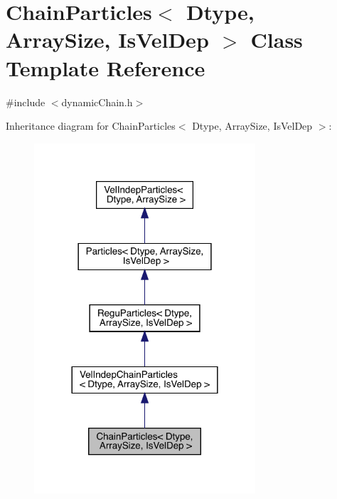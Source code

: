 \hypertarget{class_chain_particles}{}\section{Chain\+Particles$<$ Dtype, Array\+Size, Is\+Vel\+Dep $>$ Class Template Reference}
\label{class_chain_particles}


{\ttfamily \#include $<$dynamic\+Chain.\+h$>$}



Inheritance diagram for Chain\+Particles$<$ Dtype, Array\+Size, Is\+Vel\+Dep $>$\+:
\nopagebreak
\begin{figure}[H]
\begin{center}
\leavevmode
\includegraphics[width=233pt]{class_chain_particles__inherit__graph}
\end{center}
\end{figure}


